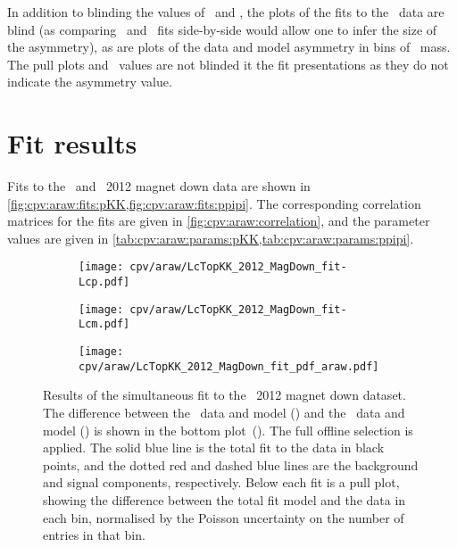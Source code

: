 In addition to blinding the values of \ARaw\ and \dACP, the plots of the fits
to the \APLambdac\ data are blind (as comparing \PLambdac\ and \APLambdac\ fits
side-by-side would allow one to infer the size of the asymmetry), as are plots
of the data and model asymmetry in bins of \PLambdac\ mass.
The pull plots and \chisq\ values are not blinded it the fit presentations as
they do not indicate the asymmetry value.

\section{Fit results}
\label{chap:cpv:araw:results}

Fits to the \pKK\ and \ppipi\ 2012 magnet down data are shown in
\cref{fig:cpv:araw:fits:pKK,fig:cpv:araw:fits:ppipi}.
The corresponding correlation matrices for the fits are given in
\cref{fig:cpv:araw:correlation}, and the parameter values are given in
\cref{tab:cpv:araw:params:pKK,tab:cpv:araw:params:ppipi}.

\begin{figure}
  \begin{subfigure}[b]{0.5\textwidth}
    \texttt{[image: cpv/araw/LcTopKK\_2012\_MagDown\_fit-Lcp.pdf]}
    \caption{\PLambdac}
    \label{fig:cpv:araw:fits:pKK:Lcp}
  \end{subfigure}
  \begin{subfigure}[b]{0.5\textwidth}
    \texttt{[image: cpv/araw/LcTopKK\_2012\_MagDown\_fit-Lcm.pdf]}
    \caption{\APLambdac}
    \label{fig:cpv:araw:fits:pKK:Lcm}
  \end{subfigure}
  \begin{subfigure}[b]{0.5\textwidth}
    \texttt{[image: cpv/araw/LcTopKK\_2012\_MagDown\_fit\_pdf\_araw.pdf]}
    \caption{\ARaw}
    \label{fig:cpv:araw:fits:pKK:ARaw}
  \end{subfigure}
  \caption{%
    Results of the simultaneous fit to the \pKK\ 2012 magnet down dataset.
    The difference between the \PLambdac\ data and model
    () and the \APLambdac\ data and model
    () is shown in the bottom
    plot~().
    The full offline selection is applied.
    The solid blue line is the total fit to the data in black points, and the
    dotted red and dashed blue lines are the background and signal components,
    respectively.
    Below each fit is a pull plot, showing the difference between the total fit
    model and the data in each bin, normalised by the Poisson uncertainty on
    the number of entries in that bin.
  }
  \label{fig:cpv:araw:fits:pKK}
\end{figure}

